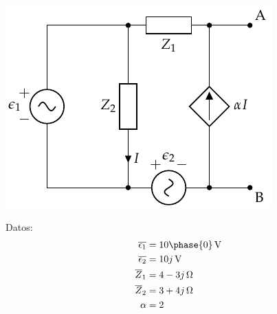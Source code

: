 \documentclass[12pt]{article}
\begin{document}
\begin{center}
\includegraphics{figs/Thevenin5}
\end{center}

Datos:
\begin{align*}
  \overline{\epsilon_1} &= \SI[parse-numbers=false]{10\phase{0}}{\volt}\\
  \overline{\epsilon_2} &= \SI[parse-numbers=false]{10j}{\volt}\\
  \overline{Z}_1 &= \SI[parse-numbers=false]{4 - 3j}{\ohm}\\
  \overline{Z}_2 &= \SI[parse-numbers=false]{3 + 4j}{\ohm}\\
  \alpha &= 2
\end{align*}

\noindent\hrulefill
\end{document}
